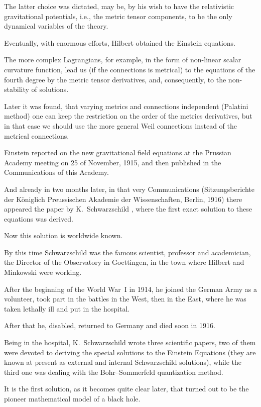 The latter choice was dictated, may be, by his wish to have the relativistic gravitational potentials, i.e., the metric tensor components, to be the only dynamical variables of the theory. 

Eventually, with enormous efforts, Hilbert obtained the Einstein equations. 

The more complex Lagrangians, for example, in the form of non-linear scalar curvature function, lead us (if the connections is metrical) to the equations of the  fourth degree by the metric tensor derivatives, and, consequently, to the non-stability of solutions. 

Later it was found, that varying metrics and connections independent (Palatini method) one can keep the restriction on the order of the metrics derivatives, but in that case we should use the more general Weil connections instead of  the metrical connections.



Einstein reported on the new gravitational field equations at the Prussian Academy meeting on 25 of November, 1915, and then published in the Commu\-ni\-cations of this Academy. 

And already in two months later, in that very Commu\-ni\-cations (Sitzungsberichte der K\"oniglich Preussischen Akademie der Wissenschaf\-ten, Berlin, 1916)  there appeared the paper by K.~Schwarzschild  \cite{berez:Sch}, where the first exact solution to these equations was derived. 

Now this solution is worldwide known. 

By this time Schwarzschild was the famous scientist, professor and acade\-mician, the Director of the Observatory in Goettingen, in the town where Hilbert and Minkowski were working. 

After the beginning of the World War~I in 1914, he joined the German Army as a volunteer, took part in the battles in the West, then in the East, where he was taken lethally ill and put in the hospital.

After that he, disabled, returned to Germany and died soon in 1916. 

Being in the hospital, K.~Schwarzschild wrote three scientific papers, two of them were devoted to deriving the special solutions to the Einstein Equations (they are known at present as external and internal Schwarzschild solutions), while the third one was dealing with the Bohr--Sommerfeld quantization method. 

It is the first solution, as it becomes quite clear later, that turned out to be the pioneer mathematical model of a black hole. 

